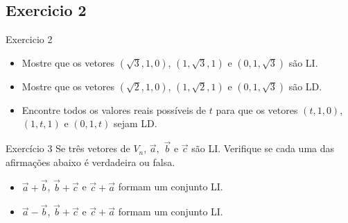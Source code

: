 \documentclass{beamer}
\begin{document}
\subsection{Exercicio 2}

\begin{frame}{Exercicio 2}

\begin{itemize}
    \item Mostre que os vetores $(\sqrt{3}, 1, 0)$, $(1,\sqrt{3}, 1)$ e $(0,1,\sqrt{3})$ são LI.
    
\item Mostre que os vetores $(\sqrt{2}, 1, 0)$, $(1,\sqrt{2}, 1)$ e $(0,1,\sqrt{3})$ são LD.

\item Encontre todos os valores reais possíveis de $t$ para que os vetores $(t, 1, 0)$, $(1,t, 1)$ e $(0,1,t)$ sejam LD.

\end{itemize}

\end{frame}

\begin{frame}{Exercício 3}
   Se três vetores de $V_n$, $\vec{a},$  $\vec{b}$ e $\vec{c}$ são LI. Verifique se cada uma das afirmações abaixo é verdadeira ou falsa. 
    \begin{itemize}
        \item $\vec{a}+\vec{b}$, $\vec{b}+\vec{c}$ e $\vec{c} + \vec{a}$ formam um conjunto LI.
        
        \item $\vec{a}-\vec{b}$, $\vec{b}+\vec{c}$ e $\vec{c} + \vec{a}$ formam um conjunto LI.
    \end{itemize}
\end{frame}
\end{document}
